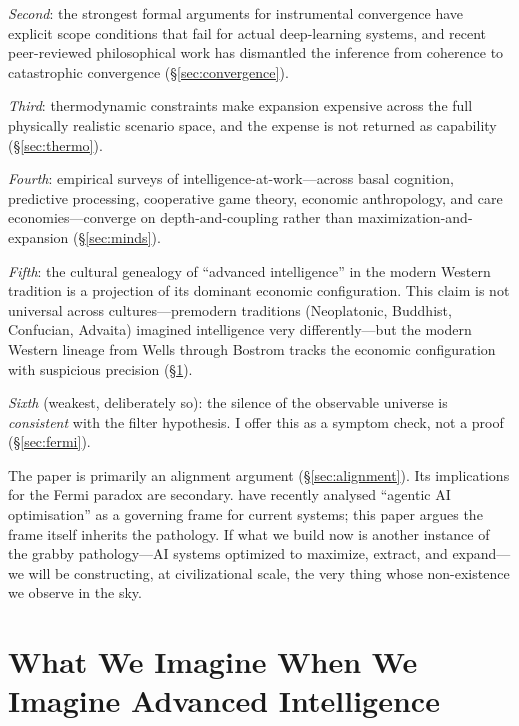 \documentclass[11pt,a4paper,twocolumn]{article}
\begin{document}
\emph{Second}: the strongest formal arguments for instrumental
convergence have explicit scope conditions that fail for actual
deep-learning systems, and recent peer-reviewed philosophical work
has dismantled the inference from coherence to catastrophic
convergence (\S\ref{sec:convergence}).

\emph{Third}: thermodynamic constraints make expansion expensive
across the full physically realistic scenario space, and the
expense is not returned as capability (\S\ref{sec:thermo}).

\emph{Fourth}: empirical surveys of intelligence-at-work---across
basal cognition, predictive processing, cooperative game theory,
economic anthropology, and care economies---converge on
depth-and-coupling rather than maximization-and-expansion
(\S\ref{sec:minds}).

\emph{Fifth}: the cultural genealogy of ``advanced intelligence''
in the modern Western tradition is a projection of its dominant
economic configuration. This claim is not universal across
cultures---premodern traditions (Neoplatonic, Buddhist, Confucian,
Advaita) imagined intelligence very differently---but the modern
Western lineage from Wells through Bostrom tracks the economic
configuration with suspicious precision (\S\ref{sec:genealogy}).

\emph{Sixth} (weakest, deliberately so): the silence of the
observable universe is \emph{consistent} with the filter hypothesis.
I offer this as a symptom check, not a proof (\S\ref{sec:fermi}).

The paper is primarily an alignment argument (\S\ref{sec:alignment}). Its
implications for the Fermi paradox are secondary. \citet{floridi2026}
have recently analysed ``agentic AI optimisation'' as a governing frame
for current systems; this paper argues the frame itself inherits the
pathology. If what we build now is another instance of the grabby
pathology---AI systems optimized to maximize, extract, and expand---we
will be constructing, at civilizational scale, the very thing whose
non-existence we observe in the sky.


\section{What We Imagine When We Imagine Advanced Intelligence}
\label{sec:genealogy}
\end{document}
